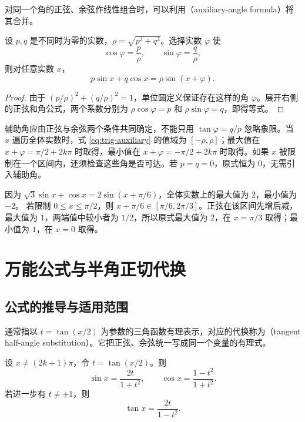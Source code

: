 \documentclass[UTF8]{ctexart}
\begin{document}
对同一个角的正弦、余弦作线性组合时，可以利用（auxiliary-angle formula）将其合并。

\begin{proposition}[辅助角公式]
设 $p,q$ 是不同时为零的实数，$\rho=\sqrt{p^2+q^2}$。选择实数 $\varphi$ 使
\[
  \cos\varphi=\frac p\rho,\qquad \sin\varphi=\frac q\rho,
\]
则对任意实数 $x$，
\begin{equation}\label{eq:trig-auxiliary}
  \boxed{p\sin x+q\cos x=\rho\sin(x+\varphi)}.
\end{equation}
\end{proposition}

\begin{proof}
由于 $(p/\rho)^2+(q/\rho)^2=1$，单位圆定义保证存在这样的角 $\varphi$。展开右侧的正弦和角公式，两个系数分别为 $\rho\cos\varphi=p$ 和 $\rho\sin\varphi=q$，即得等式。
\end{proof}

辅助角应由正弦与余弦两个条件共同确定，不能只用 $\tan\varphi=q/p$ 忽略象限。当 $x$ 遍历全体实数时，式 \eqref{eq:trig-auxiliary} 的值域为 $[-\rho,\rho]$；最大值在 $x+\varphi=\pi/2+2k\pi$ 时取得，最小值在 $x+\varphi=-\pi/2+2k\pi$ 时取得。如果 $x$ 被限制在一个区间内，还须检查这些角是否可达。若 $p=q=0$，原式恒为 $0$，无需引入辅助角。

\begin{example}[合并与区间最值]
因为 $\sqrt3\sin x+\cos x=2\sin(x+\pi/6)$，全体实数上的最大值为 $2$，最小值为 $-2$。
若限制 $0\le x\le\pi/2$，则 $x+\pi/6\in[\pi/6,2\pi/3]$。正弦在该区间先增后减，最大值为 $1$，两端值中较小者为 $1/2$，所以原式最大值为 $2$，在 $x=\pi/3$ 取得；最小值为 $1$，在 $x=0$ 取得。
\end{example}

\section{万能公式与半角正切代换}
\label{sec:trig-universal}

\subsection{公式的推导与适用范围}

通常指以 $t=\tan(x/2)$ 为参数的三角函数有理表示，对应的代换称为（tangent half-angle substitution）。它把正弦、余弦统一写成同一个变量的有理式。

\begin{theorem}[万能公式]
设 $x\ne(2k+1)\pi$，令 $t=\tan(x/2)$。则
\begin{equation}\label{eq:trig-universal}
  \boxed{\sin x=\frac{2t}{1+t^2},\qquad
  \cos x=\frac{1-t^2}{1+t^2}}.
\end{equation}
若进一步有 $t\ne\pm1$，则
\begin{equation}\label{eq:trig-universal-tan}
  \boxed{\tan x=\frac{2t}{1-t^2}}.
\end{equation}
\end{theorem}
\end{document}
